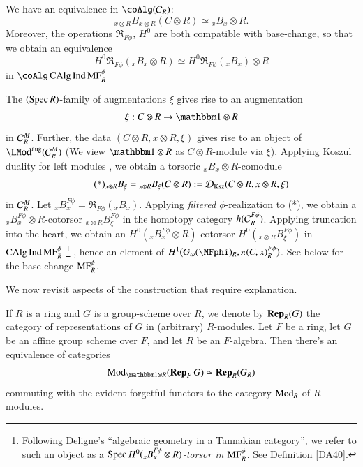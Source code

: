 \sspar{}\label{DX33}
We have an equivalence in $\coAlg(\Cc_R)$:
\[
\tag{*}
{_{x \otimes R} B_{x \otimes R}}(C \otimes R) \simeq 
{_x B_x} \otimes R.
\]
Moreover, the operations $\Re_{F\phi}$, $H^0$ are both compatible with base-change, so that we obtain an equivalence 
\[
H^0 \Re_{F\phi} ({_x B_x} \otimes R)
\simeq
H^0 \Re_{F\phi} ({_x B_x}) \otimes R
\]
in $\coAlg \CAlg \Ind \opnm{MF}^\phi_R$



\sspar{}\label{DA36}
The $(\operatorname{Spec} R)$-family of augmentations $\xi$ gives rise to an augmentation
\[
\xi:C \otimes R \to \one \otimes R
\]
in $\mathcal{C}_R^M$. Further, the data $(C\otimes R, x \otimes R, \xi)$ gives rise to an object of $\LMod^\m{aug}(\Cc_R^M)$ (We view $\one \otimes R$ as $C\otimes R$-module via $\xi$). Applying Koszul duality for left modules \cite{LMKoszul, brantner2025pd}, we obtain a torsoric ${_x B_x} \otimes R$-comodule
\[
\tag{*}
{_{x\otimes R} B_\xi} = {_{x\otimes R} B_\xi}(C \otimes R) := \mathcal{D}_{\mathrm{Ksz}}
(C\otimes R, x \otimes R, \xi)
\]
in $\mathcal{C}_R^M$. Let ${_xB_x^{F\phi} } = \Re_{F\phi} ({_xB_x})$. Applying \textit{filtered $\phi$}-realization to (*), we obtain a ${_x B^{F\phi}_x}\otimes R$-cotorsor ${_{x\otimes R}B_\xi^{F\phi}}$ in the homotopy category $h (\mathcal{C}^{F\phi}_R)$. Applying truncation into the heart, we obtain an $H^0({_x B^{F\phi}_x}\otimes R)$-cotorsor $H^0({_{x\otimes R}B_\xi^{F\phi}})$ in $\operatorname{CAlg} \operatorname{Ind}  \operatorname{MF}^\phi_R$
\footnote{Following Deligne's ``algebraic geometry in a Tannakian category'', we refer to such an object as a \emph{$\operatorname{Spec} H^0({_x B^{F\phi}_x}\otimes R)$-torsor in $\operatorname{MF}^\phi_R$}. See Definition \ref{DA40}.}
, hence an element of $H^1\big(G_\om(\MFphi)_R, \pi(C,x)^{F\phi}_R\big)$. See below for the base-change $\operatorname{MF}^\phi_R$.

\medskip

We now revisit aspects of the construction that require explanation. 

\begin{ssLemma}
\label{DA37}
If $R$ is a ring and $G$ is a group-scheme over $R$, we denote by $\operatorname{\bf{Rep}}_R(G)$ the category of representations of $G$ in (arbitrary) $R$-modules. Let $F$ be a ring, let $G$ be an affine group scheme over $F$, and let $R$ be an $F$-algebra. Then there's an equivalence of categories 
\[
\Mod_{\one \otimes R}(\Rep_F G) \simeq \Rep_R(G_R)
\] 
commuting with the evident forgetful functors to the category $\operatorname{Mod}_R$ of $R$-modules. 
\end{ssLemma}


